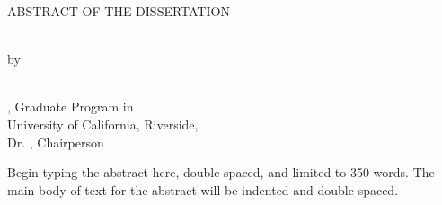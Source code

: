 \begin{center}

        ABSTRACT OF THE DISSERTATION
        \\
        \null

        \Title
        \\


        by
        \\


        \Author
        \\
        \null

        \Degree, Graduate Program in \FieldofStudy \\
        University of California, Riverside, \ConferralDate \\
        Dr. \CommChair, Chairperson
        \\
        \null
\end{center}

\doublespacing

Begin typing the abstract here, double-spaced, and limited to 350 words.
The main body of text for the abstract will be indented and double spaced.
